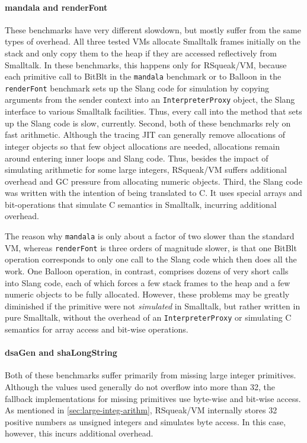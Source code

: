 \documentclass[
10pt,          %
]{sigplanconf}
\begin{document}
\paragraph{mandala and renderFont}
These benchmarks have very different slowdown, but mostly suffer from the same
types of overhead. All three tested \acp{VM} allocate Smalltalk frames
initially on the stack and only copy them to the heap if they are accessed
reflectively from Smalltalk. In these benchmarks, this happens only for
RSqueak/VM, because each primitive call to BitBlt in the \verb!mandala!
benchmark or to Balloon in the \verb!renderFont! benchmark sets up the Slang
code for simulation by copying arguments from the sender context into an
\verb!InterpreterProxy! object, the Slang interface to various Smalltalk
facilities. Thus, every call into the method that sets up the Slang code is
slow, currently. Second, both of these benchmarks rely on fast arithmetic.
Although the tracing \ac{JIT} can generally remove allocations of integer
objects so that few object allocations are needed, allocations remain around
entering inner loops and Slang code. Thus, besides the impact of simulating
arithmetic for some large integers, RSqueak/VM suffers additional overhead and
GC pressure from allocating numeric objects. Third, the Slang code was written
with the intention of being translated to C. It uses special arrays and
bit-operations that simulate C semantics in Smalltalk, incurring additional
overhead.

The reason why \verb!mandala! is only about a factor of two slower
than the standard \ac{VM}, whereas \verb!renderFont! is three orders of
magnitude slower, is that one BitBlt operation corresponds to only one
call to the Slang code which then does all the work. One Balloon
operation, in contrast, comprises dozens of very short calls into
Slang code, each of which forces a few stack frames to the heap and a
few numeric objects to be fully allocated. However, these problems may
be greatly diminished if the primitive were not \emph{simulated} in
Smalltalk, but rather written in pure Smalltalk, without the overhead
of an \verb!InterpreterProxy! or simulating C semantics for array
access and bit-wise operations.

\paragraph{dsaGen and shaLongString}
Both of these benchmarks suffer primarily from missing large integer
primitives. Although the values used generally do not overflow into
more than \SI{32}{\bit}, the fallback implementations for missing primitives
use byte-wise and bit-wise access. As mentioned in
\autoref{sec:large-integ-arithm}, RSqueak/VM internally stores \SI{32}{\bit}
positive numbers as unsigned integers and simulates byte access. In
this case, however, this incurs additional overhead.
\end{document}
